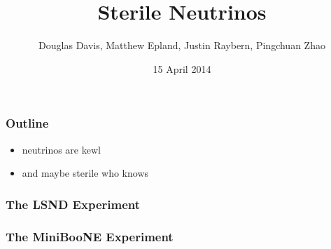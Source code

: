 \documentclass[mathserif,18pt,xcolor=table]{beamer}
\title[PHY 505 Project 3]{Sterile Neutrinos}
\author[DD, ME, JR, PZ]{{\small Douglas Davis, Matthew Epland, Justin Raybern, Pingchuan Zhao}}
\institute{\it{Duke University} \\ \mbox{} \\ \mbox{} \\ \pgfuseimage{dukelogo}}
\date[15 April 2014]{15 April 2014}
\begin{document}
\beamertemplateballitem
\frame{\titlepage}

\begin{frame}
  \frametitle{Outline}
  \begin{itemize}
    \item neutrinos are kewl
    \item and maybe sterile who knows
  \end{itemize}
\end{frame}

\begin{frame}
  \frametitle{The LSND Experiment}
\end{frame}

\begin{frame}
  \frametitle{The MiniBooNE Experiment}
\end{frame}
\end{document}
